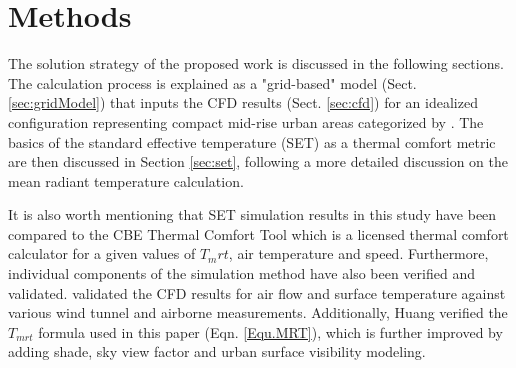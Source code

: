 \documentclass[smallextended]{svjour3}
\begin{document}
%
%
%
%
%
%
%
%
%
%
%
%
%
%
%
%
%   
%
%
%


\section{Methods}
The solution strategy of the proposed work is discussed in the following sections. The calculation process is explained as a "grid-based" model (Sect. \ref{sec:gridModel})  that inputs the CFD results (Sect. \ref{sec:cfd})  for an idealized configuration representing compact mid-rise urban areas categorized by \citet{stewart2012local}. The basics of the standard effective temperature (SET) as a thermal comfort metric are then discussed in Section \ref{sec:set}, following a more detailed discussion on the mean radiant temperature calculation. 

It is also worth mentioning that SET simulation results in this study have been compared to the CBE Thermal Comfort Tool \cite{hoyt2013cbe} which is a licensed thermal comfort calculator for a given values of $T_mrt$, air temperature and speed. Furthermore, individual components of the simulation method have also been verified and validated. \citet{nazarian2014effects, nazarian2015cfd} validated the CFD results for air flow and surface temperature against various wind tunnel and airborne measurements. Additionally, Huang \cite{huang2014citycomfort+} verified the $T_{mrt}$ formula used in this paper (Eqn. \ref{Equ.MRT}), which is further improved by adding shade, sky view factor and urban surface visibility modeling. 
\end{document}
